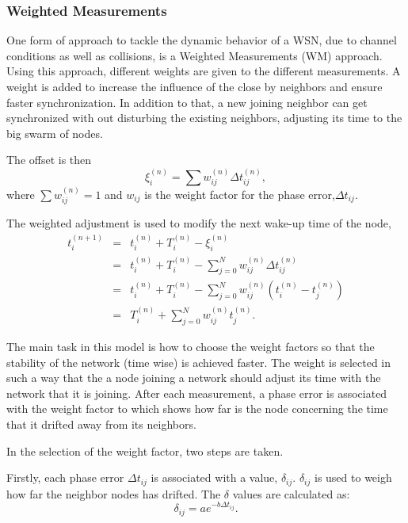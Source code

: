 \documentclass[journal]{IEEEtran}
\begin{document}
\subsubsection{\textbf{Weighted Measurements}}
One form of approach to tackle the dynamic behavior of a WSN, due to channel conditions as well as collisions, is a
Weighted Measurements (WM) approach. Using this approach, different
weights are given to the different measurements. A weight is added to
increase the influence of the close by neighbors and ensure
faster synchronization. In addition to that, a new joining neighbor
can get synchronized with out disturbing the existing neighbors,
adjusting its time to the big swarm of nodes.\par
The offset is then
\begin{equation}
\xi_i^{(n)} = \sum{w_{ij}^{(n)}\Delta t_{ij}^{(n)}} ,
\end{equation}
where $\sum{w_{ij}^{(n)}= 1}$ and $w_{ij}$ is the weight factor for the phase error,$\Delta t_{ij}$.
\par
The weighted adjustment is used to modify the next wake-up time of
the node,
\begin{eqnarray*}
t_i^{(n+1)} &=& t_i^{(n)} + T_i^{(n)} - \xi_i^{(n)} \\ &=& t_i^{(n)}
+ T_i^{(n)} - \sum_{j=0}^N{w_{ij}^{(n)}\Delta t_{ij}^{(n)}} \\ &=&
t_i^{(n)}+ T_i^{(n)} -
\sum_{j=0}^N{w_{ij}^{(n)}(t_i^{(n)}-t_j^{(n)})} \\ &=& T_i^{(n)} + \sum_{j=0}^N{w_{ij}^{(n)}t_j^{(n)}}.
\end{eqnarray*}
\par
The main task in this model is how to choose the weight factors
so that the stability of the network (time wise) is achieved faster. The weight is selected in such a way that the a node
joining a network should adjust its time with the network that it is
joining. After each measurement, a phase error is associated with
the weight  factor to which shows how far is the node concerning the
time that it drifted away from its neighbors.
\par \noindent In the selection of the weight factor, two steps are taken. \par \noindent
Firstly, each phase error $\Delta t_{ij}$ is associated with
a value, $\delta_{ij}$. $\delta_{ij}$ is used to weigh how far the neighbor nodes
has drifted. The $\delta$ values are calculated as:
\begin{equation}
\delta_{ij} = ae^{-b\Delta t_{ij}}.
\end{equation}
\end{document}
